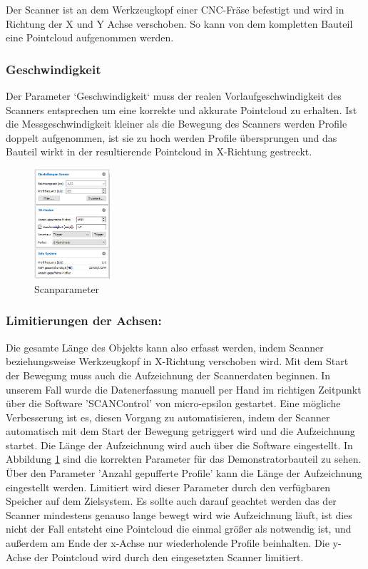 \documentclass[../main.tex]{subfiles}
\begin{document}
Der Scanner ist an dem Werkzeugkopf einer CNC-Fräse befestigt und wird 
in Richtung der X und Y Achse verschoben. So kann von dem kompletten Bauteil eine 
Pointcloud aufgenommen werden.

\subsubsection{Geschwindigkeit}
Der Parameter `Geschwindigkeit` muss der realen Vorlaufgeschwindigkeit des Scanners
entsprechen um eine korrekte und akkurate Pointcloud zu erhalten. Ist die 
Messgeschwindigkeit kleiner als die Bewegung des Scanners werden Profile doppelt 
aufgenommen, ist sie zu hoch werden Profile übersprungen und das Bauteil wirkt in 
der resultierende Pointcloud in X-Richtung gestreckt.

\begin{figure}
    \includegraphics[width=0.25\textwidth]{images/Parameter_Scan.png}
    \caption{Scanparameter}
    \label{fig:scanparameter}
\end{figure}

\subsubsection{Limitierungen der Achsen:}

Die gesamte Länge des Objekts kann also erfasst werden, indem Scanner 
beziehungsweise Werkzeugkopf in X-Richtung verschoben wird. Mit dem Start der 
Bewegung muss auch die Aufzeichnung der Scannerdaten beginnen. In unserem Fall wurde
die Datenerfassung manuell per Hand im richtigen Zeitpunkt über die Software 
'SCANControl' von micro-epsilon gestartet. 
Eine mögliche Verbesserung ist es, diesen Vorgang zu automatisieren, indem der 
Scanner automatisch mit dem Start der Bewegung getriggert wird und die Aufzeichnung
startet. Die Länge der Aufzeichnung wird auch über die Software eingestellt. 
In Abbildung \ref{fig:scanparameter} sind die korrekten Parameter für das 
Demonstratorbauteil zu sehen. Über den Parameter 'Anzahl gepufferte Profile' kann 
die Länge der Aufzeichnung eingestellt werden. Limitiert wird dieser Parameter 
durch den verfügbaren Speicher auf dem Zielsystem. Es sollte auch darauf geachtet 
werden das der Scanner mindestens genauso lange bewegt wird wie Aufzeichnung läuft, 
ist dies nicht der Fall entsteht eine Pointcloud die einmal größer als notwendig ist, 
und außerdem am Ende der x-Achse nur wiederholende Profile beinhalten. 
Die y-Achse der Pointcloud wird durch den eingesetzten Scanner limitiert. 
\end{document}
